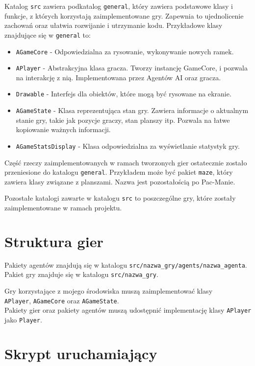 \documentclass[12pt, draft]{report}
\begin{document}
Katalog \texttt{src} zawiera podkatalog \texttt{general}, który zawiera podstawowe klasy i funkcje, z których korzystają zaimplementowane gry.
Zapewnia to ujednolicenie zachowań oraz ułatwia rozwijanie i utrzymanie kodu. 
Przykładowe klasy znajdujące się w \texttt{general} to:
\begin{itemize}
    \item \texttt{AGameCore} - Odpowiedzialna za rysowanie, wykonywanie nowych ramek.
    \item \texttt{APlayer} - Abstrakcyjna klasa gracza. Tworzy instancję GameCore, i pozwala na interakcję z nią. Implementowana przez Agentów AI oraz gracza.
    \item \texttt{Drawable} - Interfejs dla obiektów, które mogą być rysowane na ekranie.
    \item \texttt{AGameState} - Klasa reprezentująca stan gry. Zawiera informacje o aktualnym stanie gry, takie jak pozycje graczy, stan planszy itp. Pozwala na łatwe kopiowanie ważnych informacji.
    \item \texttt{AGameStatsDisplay} - Klasa odpowiedzialna za wyświetlanie statystyk gry.
\end{itemize}

Część rzeczy zaimplementowanych w ramach tworzonych gier ostatecznie zostało przeniesione do katalogu \texttt{general}. Przykładem może być pakiet \texttt{maze}, który zawiera klasy związane z planszami. Nazwa jest pozostałością po Pac-Manie.

Pozostałe katalogi zawarte w katalogu \texttt{src} to poszczególne gry, które zostały zaimplementowane w ramach projektu.

\section{Struktura gier}


Pakiety agentów znajdują się w katalogu \texttt{src/nazwa\_gry/agents/nazwa\_agenta}.
Pakiet gry znajduje się w katalogu \texttt{src/nazwa\_gry}.

Gry korzystające z mojego środowiska muszą zaimplementować klasy \\ \texttt{APlayer}, \texttt{AGameCore} oraz \texttt{AGameState}. \\
Pakiety gier oraz pakiety agentów muszą udostępnić implementację klasy \texttt{APlayer} jako \texttt{Player}.



\section{Skrypt uruchamiający}
\end{document}

